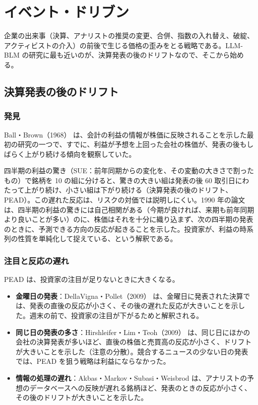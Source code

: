 \chapter{イベント・ドリブン}
\label{ch:event}

企業の出来事（決算、アナリストの推奨の変更、合併、指数の入れ替え、破綻、アクティビストの介入）の前後で生じる価格の歪みをとる戦略である。LLM-BLM の研究に最も近いのが、決算発表の後のドリフトなので、そこから始める。

\section{決算発表の後のドリフト}

\subsection{発見}

Ball・Brown（1968）\cite{ballbrown1968} は、会計の利益の情報が株価に反映されることを示した最初の研究の一つで、すでに、利益が予想を上回った会社の株価が、発表の後もしばらく上がり続ける傾向を観察していた。

\begin{paperbox}
四半期の利益の驚き（SUE：前年同期からの変化を、その変動の大きさで割ったもの）で銘柄を 10 の組に分けると、驚きの大きい組は発表の後 60 取引日にわたって上がり続け、小さい組は下がり続ける（決算発表の後のドリフト、PEAD）。この遅れた反応は、リスクの対価では説明しにくい。1990 年の論文は、四半期の利益の驚きには自己相関がある（今期が良ければ、来期も前年同期より良いことが多い）のに、株価はそれを十分に織り込まず、次の四半期の発表のときに、予測できる方向の反応が起きることを示した。投資家が、利益の時系列の性質を単純化して捉えている、という解釈である。
\end{paperbox}

\subsection{注目と反応の遅れ}

PEAD は、投資家の注目が足りないときに大きくなる。

\begin{itemize}
\item \textbf{金曜日の発表}：DellaVigna・Pollet（2009）\cite{dellavigna2009} は、金曜日に発表された決算では、発表の直後の反応が小さく、その後の遅れた反応が大きいことを示した。週末の前で、投資家の注目が下がるためと解釈される。
\item \textbf{同じ日の発表の多さ}：Hirshleifer・Lim・Teoh（2009）\cite{hlt2009} は、同じ日にほかの会社の決算発表が多いほど、直後の株価と売買高の反応が小さく、ドリフトが大きいことを示した（注意の分散）。競合するニュースの少ない日の発表では、PEAD を狙う戦略は利益にならなかった。
\item \textbf{情報の処理の遅れ}：Akbas・Markov・Subasi・Weisbrod \cite{akbas2017} は、アナリストの予想のデータベースへの反映が遅れる銘柄ほど、発表のときの反応が小さく、その後のドリフトが大きいことを示した。
\end{itemize}

